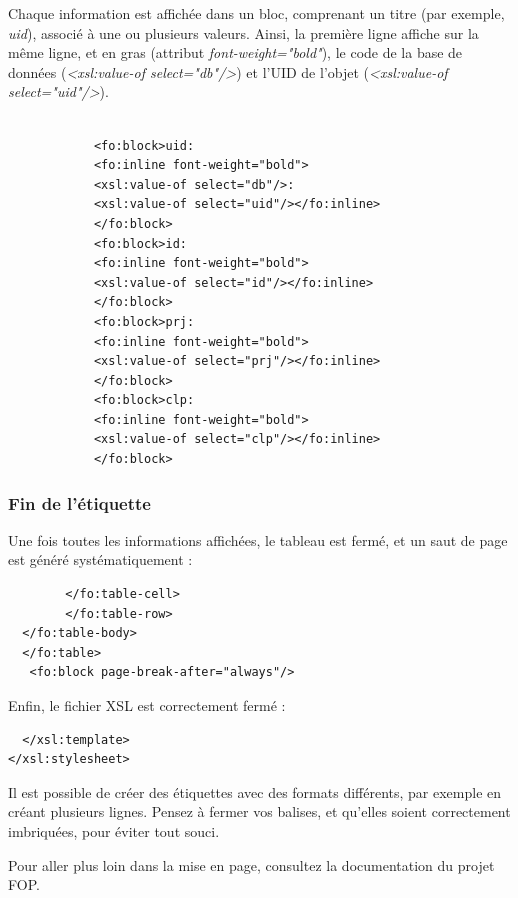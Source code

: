 Chaque information est affichée dans un bloc, comprenant un titre (par exemple, \textit{uid}), associé à une ou plusieurs valeurs. Ainsi, la première ligne affiche sur la même ligne, et en gras (attribut \textit{font-weight="bold"}), le code de la base de données (\textit{<xsl:value-of select="db"/>}) et l'UID de l'objet (\textit{<xsl:value-of select="uid"/>}).

\begin{lstlisting}   		

  			<fo:block>uid:
  			<fo:inline font-weight="bold">
  			<xsl:value-of select="db"/>:
  			<xsl:value-of select="uid"/></fo:inline>
  			</fo:block>
  			<fo:block>id:
  			<fo:inline font-weight="bold"> 
  			<xsl:value-of select="id"/></fo:inline>
  			</fo:block>
  			<fo:block>prj:
  			<fo:inline font-weight="bold"> 
  			<xsl:value-of select="prj"/></fo:inline>
  			</fo:block>
  			<fo:block>clp:
  			<fo:inline font-weight="bold">
  			<xsl:value-of select="clp"/></fo:inline>
  			</fo:block>
\end{lstlisting}

\subsubsection{Fin de l'étiquette}

Une fois toutes les informations affichées, le tableau est fermé, et un saut de page est généré systématiquement :
\begin{lstlisting}
  		</fo:table-cell>
  	  	</fo:table-row>
  </fo:table-body>
  </fo:table>
   <fo:block page-break-after="always"/>
\end{lstlisting}

Enfin, le fichier XSL est correctement fermé :
\begin{lstlisting}
  </xsl:template>
</xsl:stylesheet>
\end{lstlisting}

Il est possible de créer des étiquettes avec des formats différents, par exemple en créant plusieurs lignes. Pensez à fermer vos balises, et qu'elles soient correctement imbriquées, pour éviter tout souci.

Pour aller plus loin dans la mise en page, consultez la documentation du projet FOP.